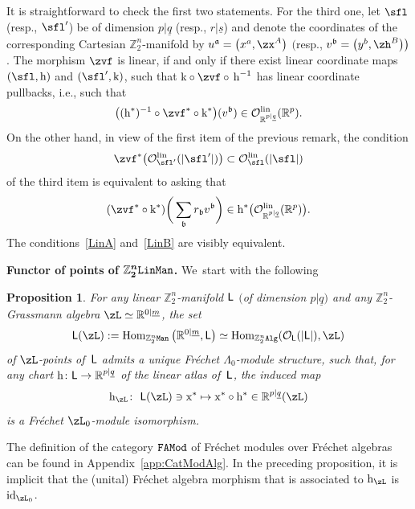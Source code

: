 \documentclass[10pt,a4paper]{amsart}
\newcommand{\rmh}{\textnormal{h}}
\newcommand{\rmk}{\textnormal{k}}
\newcommand{\op}[1]{\operatorname{#1}}
\newcommand{\R}{{\mathbb R}}
\newcommand{\Z}{{\mathbb Z}}
\def\ul{\underline}
\def\cO{\mathcal{O}}
\def\ul{\underline}
\newcommand{\0}{\otimes}
\newcommand{\id}{\op{id}}
\newcommand{\z}{\Z_2^n}
\numberwithin{equation}{section}
\newtheorem{Proposition}[Theorem]{Proposition}
 { \theoremstyle{definition}
\newtheorem{Definition}[Theorem]{Definition}
\newtheorem{Example}[Theorem]{Example}
\newtheorem{Remark}[Theorem]{Remark} }
\begin{document}
It is straightforward to check the first two statements. For the third one, let $\sfl$ (resp., $\sfl'$) be of dimension $p|\ul q$ (resp., $r|\ul s$) and denote the coordinates of the corresponding Cartesian $\z$-manifold by $u^{\mathfrak a}=\big(x^a,\zx^A\big)$ $\big($resp., $v^{\mathfrak b}=\big(y^b,\zh^B\big)\big)$. The morphism $\zvf$ is linear, if and only if there exist linear coordinate maps $(\sfl,\rmh)$ and $(\sfl',\rmk)$, such that $\rmk\circ\zvf\circ\,\rmh^{-1}$ has linear coordinate pullbacks, i.e., such that
\begin{gather}\label{LinA}
\big((\rmh^*)^{-1}\circ\zvf^*\circ\rmk^*\big)(v^{\mathfrak b})\in\cO^{\op{lin}}_{\R^{p|\ul q}}(\R^p).
\end{gather}
On the other hand, in view of the first item of the previous remark, the condition
\[
\zvf^*\big(\cO^{\op{lin}}_{\sfl'}(|\sfl'|)\big)\subset\cO^{\op{lin}}_{\sfl}(|\sfl|)
\]
of the third item is equivalent to asking that
\begin{gather}\label{LinB}
(\zvf^*\circ\rmk^*)\bigg(\sum_{\mathfrak{b}}r_{\mathfrak{b}}v^{\mathfrak{b}}\bigg)\in \rmh^*\big(\cO^{\op{lin}}_{\R^{p|\ul q}}(\R^p)\big).
\end{gather}
The conditions~\eqref{LinA} and~\eqref{LinB} are visibly equivalent.

\medskip\noindent
{\bf Functor of points of $\boldsymbol{\z{\tt LinMan}}$.} We~start with the following

\begin{Proposition}\label{FL0Mod}
For any linear $\z$-manifold $\sf{L}$ $($of dimension $p|\ul q)$ and any $\z$-Grassmann algebra $\zL\simeq \R^{0|\underline{m}}$, the set
\[
{\sf{L}}(\zL):=\op{Hom}_{\z {\tt Man}}\big(\R^{0|\underline{m}},{\sf L}\big)\simeq \op{Hom}_{\z\tt Alg}(\cO_{\sf L}(|{\sf L}|),\zL)
\]
of $\zL$-points of $\,\sf L$ admits a unique Fr\'echet $\Lambda_0$-module structure, such that, for any chart ${\rm h}\colon {\sf L}\to \R^{p|\ul q}$ of the linear atlas of $\,\sf{L}$, the induced map
\[
{\rm h}_\zL\colon\ {\sf{L}}(\zL)\ni {\rm x}^*\mapsto {\rm x}^*\circ{\rm h}^*\in\R^{p|\ul q}(\zL)
\]
is a Fr\'echet $\zL_0$-module isomorphism.
\end{Proposition}
%
The definition of the category $\tt FAMod$ of Fr\'echet modules over Fr\'echet algebras can be found in Appendix~\ref{app:CatModAlg}. In the preceding proposition, it is implicit that the (unital) Fr\'echet algebra morphism that is associated to ${\rm h}_\zL$ is $\id_{\zL_0}$.
\end{document}
